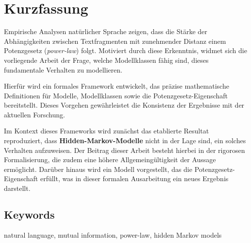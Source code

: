\documentclass[../../main.tex]{subfiles}
\begin{document}
\section*{Kurzfassung}
Empirische Analysen natürlicher Sprache zeigen, dass die Stärke der Abhängigkeiten zwischen Textfragmenten mit zunehmender Distanz einem Potenzgesetz (\textit{power-law}) folgt. Motiviert durch diese Erkenntnis, widmet sich die vorliegende Arbeit der Frage, welche Modellklassen fähig sind, dieses fundamentale Verhalten zu modellieren.

Hierfür wird ein formales Framework entwickelt, das präzise mathematische Definitionen für Modelle, Modellklassen sowie die Potenzgesetz-Eigenschaft bereitstellt. Dieses Vorgehen gewährleistet die Konsistenz der Ergebnisse mit der aktuellen Forschung.

Im Kontext dieses Frameworks wird zunächst das etablierte Resultat reproduziert, dass \textbf{Hidden-Markov-Modelle} nicht in der Lage sind, ein solches Verhalten aufzuweisen. Der Beitrag dieser Arbeit besteht hierbei in der rigorosen Formalisierung, die zudem eine höhere Allgemeingültigkeit der Aussage ermöglicht. Darüber hinaus wird ein Modell vorgestellt, das die Potenzgesetz-Eigenschaft erfüllt, was in dieser formalen Ausarbeitung ein neues Ergebnis darstellt.


\bigskip
\noindent
\subsection*{Keywords}
natural language, mutual information, power-law, hidden Markov models
\end{document}

